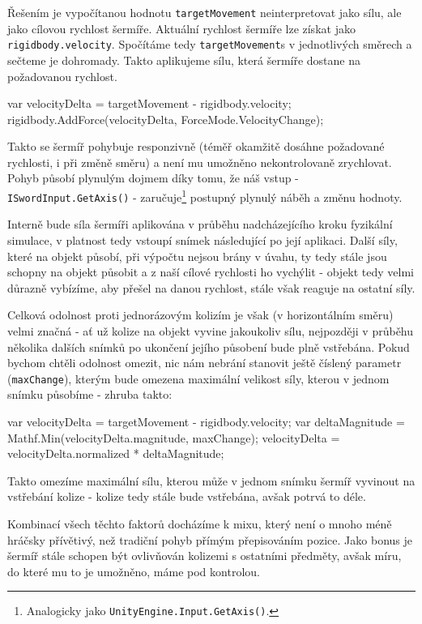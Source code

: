 Řešením je vypočítanou hodnotu \texttt{targetMovement} neinterpretovat jako sílu, ale jako cílovou rychlost šermíře. Aktuální rychlost šermíře lze získat jako \texttt{rigidbody.velocity}. Spočítáme tedy \texttt{targetMovement}s v jednotlivých směrech a sečteme je dohromady. Takto aplikujeme sílu, která šermíře dostane na požadovanou rychlost. 

\begin{code}
 var velocityDelta = targetMovement - rigidbody.velocity;
 rigidbody.AddForce(velocityDelta, ForceMode.VelocityChange);
\end{code}


Takto se šermíř pohybuje responzivně (téměř okamžitě dosáhne požadované rychlosti, i při změně směru) a není mu umožněno nekontrolovaně zrychlovat. Pohyb působí plynulým dojmem díky tomu, že náš vstup - \texttt{ISwordInput.GetAxis()} - zaručuje\footnote{Analogicky jako \texttt{UnityEngine.Input.GetAxis()}.} postupný plynulý náběh a změnu hodnoty.

Interně bude síla šermíři aplikována v průběhu nadcházejícího kroku fyzikální simulace, v platnost tedy vstoupí snímek následující po její aplikaci. Další síly, které na objekt působí, při výpočtu nejsou brány v úvahu, ty tedy stále jsou schopny na objekt působit a z naší cílové rychlosti ho vychýlit - objekt tedy velmi důrazně vybízíme, aby přešel na danou rychlost, stále však reaguje na ostatní síly. 

Celková odolnost proti jednorázovým kolizím je však (v horizontálním směru) velmi značná - ať už kolize na objekt vyvine jakoukoliv sílu, nejpozději v průběhu několika dalších snímků po ukončení jejího působení bude plně vstřebána. Pokud bychom chtěli odolnost omezit, nic nám nebrání stanovit ještě číslený parametr (\texttt{maxChange}), kterým bude omezena maximální velikost síly, kterou v jednom snímku působíme - zhruba takto:

\begin{code}
 var velocityDelta = targetMovement - rigidbody.velocity;
 var deltaMagnitude = Mathf.Min(velocityDelta.magnitude, maxChange);
 velocityDelta = velocityDelta.normalized * deltaMagnitude;
\end{code}

Takto omezíme maximální sílu, kterou může v jednom snímku šermíř vyvinout na vstřebání kolize - kolize tedy stále bude vstřebána, avšak potrvá to déle.

Kombinací všech těchto faktorů docházíme k mixu, který není o mnoho méně hráčsky přívětivý, než tradiční pohyb přímým přepisováním pozice. Jako bonus je šermíř stále schopen být ovlivňován kolizemi s ostatními předměty, avšak míru, do které mu to je umožněno, máme pod kontrolou.


